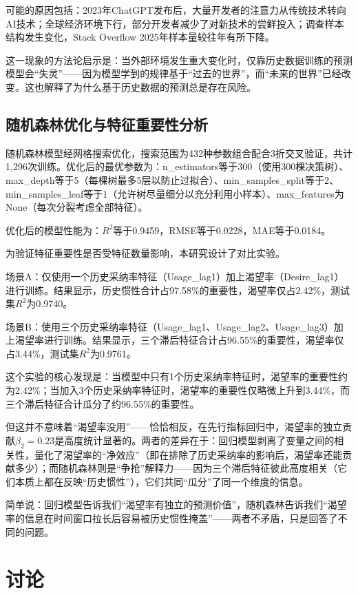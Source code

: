 \documentclass[fontset=windows]{cjc}
\begin{document}
可能的原因包括：2023年ChatGPT发布后，大量开发者的注意力从传统技术转向AI技术；全球经济环境下行，部分开发者减少了对新技术的尝鲜投入；调查样本结构发生变化，Stack Overflow 2025年样本量较往年有所下降。

这一现象的方法论启示是：当外部环境发生重大变化时，仅靠历史数据训练的预测模型会“失灵”——因为模型学到的规律基于“过去的世界”，而“未来的世界”已经改变。这也解释了为什么基于历史数据的预测总是存在风险。

\subsection{随机森林优化与特征重要性分析}
随机森林模型经网格搜索优化，搜索范围为432种参数组合配合3折交叉验证，共计1,296次训练。优化后的最优参数为：n\_estimators等于300（使用300棵决策树）、max\_depth等于5（每棵树最多5层以防止过拟合）、min\_samples\_split等于2、min\_samples\_leaf等于1（允许树尽量细分以充分利用小样本）、max\_features为None（每次分裂考虑全部特征）。

优化后的模型性能为：$R^2$等于0.9459，RMSE等于0.0228，MAE等于0.0184。

为验证特征重要性是否受特征数量影响，本研究设计了对比实验。

场景A：仅使用一个历史采纳率特征（Usage\_lag1）加上渴望率（Desire\_lag1）进行训练。结果显示，历史惯性合计占97.58\%的重要性，渴望率仅占2.42\%，测试集$R^2$为0.9740。

场景B：使用三个历史采纳率特征（Usage\_lag1、Usage\_lag2、Usage\_lag3）加上渴望率进行训练。结果显示，三个滞后特征合计占96.55\%的重要性，渴望率仅占3.44\%，测试集$R^2$为0.9761。

这个实验的核心发现是：当模型中只有1个历史采纳率特征时，渴望率的重要性约为2.42\%；当加入3个历史采纳率特征时，渴望率的重要性仅略微上升到3.44\%，而三个滞后特征合计瓜分了约96.55\%的重要性。

但这并不意味着“渴望率没用”——恰恰相反，在先行指标回归中，渴望率的独立贡献$\beta_2=0.23$是高度统计显著的。两者的差异在于：回归模型剥离了变量之间的相关性，量化了渴望率的“净效应”（即在排除了历史采纳率的影响后，渴望率还能贡献多少）；而随机森林则是“争抢”解释力——因为三个滞后特征彼此高度相关（它们本质上都在反映“历史惯性”），它们共同“瓜分”了同一个维度的信息。

简单说：回归模型告诉我们“渴望率有独立的预测价值”，随机森林告诉我们“渴望率的信息在时间窗口拉长后容易被历史惯性掩盖”——两者不矛盾，只是回答了不同的问题。

\section{讨论}
\end{document}
